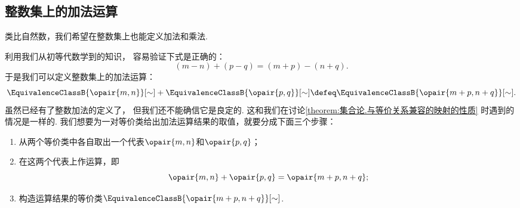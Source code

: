 \subsection{整数集上的加法运算}
类比自然数，我们希望在整数集上也能定义加法和乘法.

利用我们从初等代数学到的知识，
容易验证下式是正确的：\begin{equation*}
	(m-n)+(p-q) = (m+p)-(n+q).
\end{equation*}
于是我们可以定义整数集上的加法运算：
\begin{equation}\label{equation:集合论.整数集上的加法运算}
	\EquivalenceClassB{\opair{m,n}}[\sim] + \EquivalenceClassB{\opair{p,q}}[\sim]
	\defeq
	\EquivalenceClassB{\opair{m+p,n+q}}[\sim].
\end{equation}
虽然已经有了整数加法的定义了，
但我们还不能确信它是良定的.
这和我们在讨论\cref{theorem:集合论.与等价关系兼容的映射的性质} 时遇到的情况是一样的.
我们想要为一对等价类给出加法运算结果的取值，就要分成下面三个步骤：
\begin{enumerate}
	\item 从两个等价类中各自取出一个代表\(\opair{m,n}\)和\(\opair{p,q}\)；
	\item 在这两个代表上作运算，即\begin{equation*}
		\opair{m,n} + \opair{p,q}
		= \opair{m+p,n+q};
	\end{equation*}
	\item 构造运算结果的等价类\(\EquivalenceClassB{\opair{m+p,n+q}}[\sim]\).
\end{enumerate}

